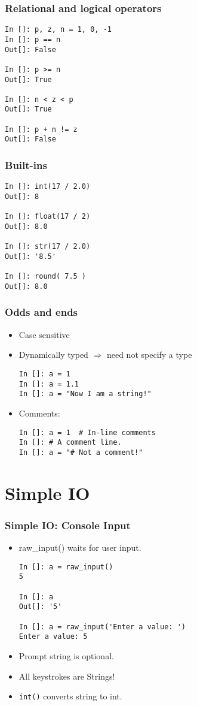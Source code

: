 \documentclass[14pt,compress]{beamer}
\newcounter{time}
\newcommand{\inctime}[1]{\addtocounter{time}{#1}{\tiny \thetime\ m}}
\begin{document}
\begin{frame}[fragile]
  \frametitle{Relational and logical operators}
  \begin{lstlisting}
In []: p, z, n = 1, 0, -1
In []: p == n
Out[]: False

In []: p >= n
Out[]: True

In []: n < z < p
Out[]: True

In []: p + n != z
Out[]: False
  \end{lstlisting}
\end{frame}

\begin{frame}[fragile]
  \frametitle{Built-ins}
  \begin{lstlisting}
In []: int(17 / 2.0)
Out[]: 8

In []: float(17 / 2)
Out[]: 8.0

In []: str(17 / 2.0)
Out[]: '8.5'

In []: round( 7.5 )
Out[]: 8.0
  \end{lstlisting}
\end{frame}

\begin{frame}[fragile]
  \frametitle{Odds and ends}
  \begin{itemize}
    \item Case sensitive
    \item Dynamically typed $\Rightarrow$ need not specify a type
      \begin{lstlisting}
In []: a = 1
In []: a = 1.1
In []: a = "Now I am a string!"
      \end{lstlisting}
    \item Comments:
      \begin{lstlisting}
In []: a = 1  # In-line comments
In []: # A comment line.
In []: a = "# Not a comment!"
      \end{lstlisting}
  \end{itemize}
  \inctime{15}
\end{frame}

\section{Simple IO}
\begin{frame}[fragile]
  \frametitle{Simple IO: Console Input}
  \small
  \begin{itemize}
    \item raw\_input() waits for user input.
      \begin{lstlisting}
In []: a = raw_input()
5

In []: a
Out[]: '5'

In []: a = raw_input('Enter a value: ')
Enter a value: 5
      \end{lstlisting}
    \item Prompt string is optional.
    \item All keystrokes are Strings!
    \item \texttt{int()} converts string to int.
  \end{itemize}
\end{frame}
\end{document}
